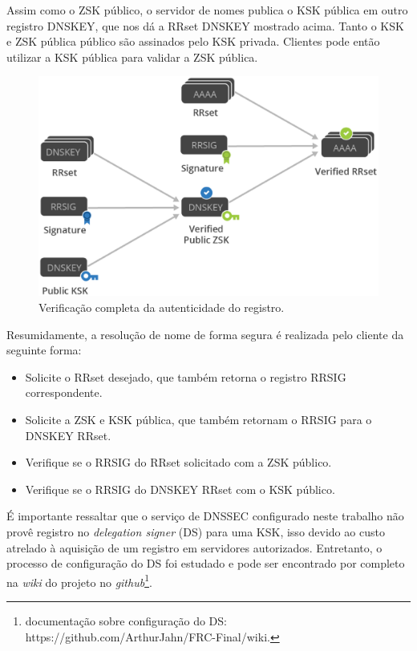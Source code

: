 \documentclass[12pt,openright,a4paper]{report}
\begin{document}
{Assim como o ZSK público, o servidor de nomes publica o KSK pública em outro registro DNSKEY, que nos dá a RRset DNSKEY mostrado acima. Tanto o KSK e ZSK pública público são assinados pelo KSK privada. Clientes pode então utilizar a KSK pública para validar a ZSK pública.

\begin{figure}[h!]
	\centering
	\includegraphics[scale=0.4]{complete_req.eps}
	\caption{Verificação completa da autenticidade do registro.}
	\label{fig:keys}
\end{figure}

Resumidamente, a resolução de nome de forma segura é realizada pelo cliente da seguinte forma:
\begin{itemize}
	\item Solicite o RRset desejado, que também retorna o registro RRSIG correspondente.
	\item Solicite a ZSK e KSK pública, que também retornam o RRSIG para o DNSKEY RRset.
	\item Verifique se o RRSIG do RRset solicitado com a ZSK público.
	\item Verifique se o RRSIG do DNSKEY RRset com o KSK público.
\end{itemize}

É importante ressaltar que o serviço de DNSSEC configurado neste trabalho não provê registro no \textit{delegation signer} (DS) para uma KSK, isso devido ao custo atrelado à aquisição de um registro em servidores autorizados. Entretanto, o processo de configuração do DS foi estudado e pode ser encontrado por completo na \textit{wiki} do projeto no \textit{github}\footnote{documentação sobre configuração do DS: https://github.com/ArthurJahn/FRC-Final/wiki.}.

}
\end{document}
